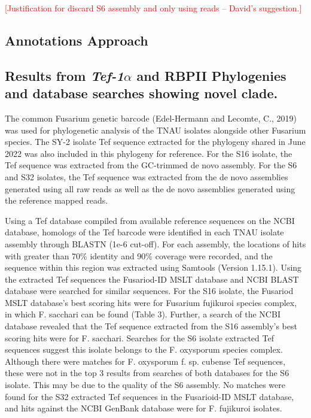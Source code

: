 \textcolor{red}{[Justification for discard S6 assembly and only using reads – David’s suggestion.]}

\subsection{Annotations Approach}

\subsection{Results from \textit{Tef-1\(\alpha\)} and RBPII Phylogenies and database searches showing novel clade.}

The common Fusarium genetic barcode (Edel-Hermann and Lecomte, C., 2019) was used for phylogenetic analysis of the TNAU isolates alongside other Fusarium species. The SY-2 isolate \ac{Tef} sequence extracted for the phylogeny shared in June 2022 was also included in this phylogeny for reference. For the S16 isolate, the \ac{Tef} sequence was extracted from the GC-trimmed de novo assembly. For the S6 and S32 isolates, the \ac{Tef} sequence was extracted from the de novo assemblies generated using all raw reads as well as the de novo assemblies generated using the reference mapped reads. 

Using a \ac{Tef} database compiled from available reference sequences on the NCBI database, homologs of the \ac{Tef} barcode were identified in each TNAU isolate assembly through BLASTN (1e-6 cut-off). For each assembly, the locations of hits with greater than 70\% identity and 90\% coverage were recorded, and the sequence within this region was extracted using Samtools (Version 1.15.1). Using the extracted \ac{Tef} sequences the Fusariod-ID MSLT database and NCBI BLAST database were searched for similar sequences. For the S16 isolate, the Fusariod MSLT database's best scoring hits were for Fusarium fujikuroi species complex, in which F. sacchari can be found (Table 3). Further, a search of the NCBI database revealed that the \ac{Tef} sequence extracted from the S16 assembly's best scoring hits were for F. sacchari. Searches for the S6 isolate extracted \ac{Tef} sequences suggest this isolate belongs to the F. oxysporum species complex. Although there were matches for F. oxysporum f. sp. cubense \ac{Tef} sequences, these were not in the top 3 results from searches of both databases for the S6 isolate. This may be due to the quality of the S6 assembly. No matches were found for the S32 extracted \ac{Tef} sequences in the Fusarioid-ID MSLT database, and hits against the NCBI GenBank database were for F. fujikuroi isolates. 

